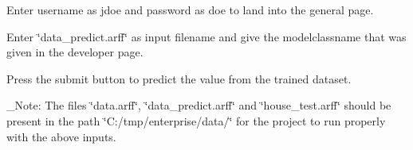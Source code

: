 \begin{DoxyEnumerate}
\item Enter username as \textquotesingle{}jdoe\textquotesingle{} and password as \textquotesingle{}doe\textquotesingle{} to land into the general page.
\item Enter \char`\"{}data\+\_\+predict.\+arff\char`\"{} as input filename and give the modelclassname that was given in the developer page.
\item Press the submit button to predict the value from the trained dataset.
\end{DoxyEnumerate}

\+\_\+\+Note\+: The files \char`\"{}data.\+arff\char`\"{}, \char`\"{}data\+\_\+predict.\+arff\char`\"{} and \char`\"{}house\+\_\+test.\+arff\char`\"{} should be present in the path \char`\"{}\+C\+:/tmp/enterprise/data/\char`\"{} for the project to run properly with the above inputs. 